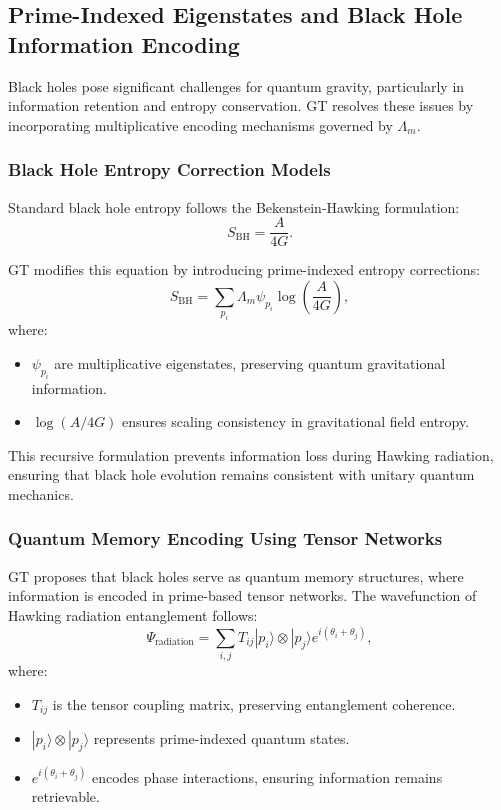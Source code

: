 \documentclass{article}
\theoremstyle{plain}
\begin{document}
\subsection{Prime-Indexed Eigenstates and Black Hole Information Encoding}
Black holes pose significant challenges for quantum gravity, particularly in information retention and entropy conservation. GT resolves these issues by incorporating multiplicative encoding mechanisms governed by $\Lambda_m$.

\subsubsection{Black Hole Entropy Correction Models}
Standard black hole entropy follows the Bekenstein-Hawking formulation:
\begin{equation}
    S_{\text{BH}} = \frac{A}{4 G}.
\end{equation}

GT modifies this equation by introducing prime-indexed entropy corrections:
\begin{equation}
    S_{\text{BH}} = \sum_{p_i} \Lambda_m \psi_{p_i} \log \left( \frac{A}{4G} \right),
\end{equation}
where:
\begin{itemize}
    \item $\psi_{p_i}$ are multiplicative eigenstates, preserving quantum gravitational information.
    \item $\log (A/4G)$ ensures scaling consistency in gravitational field entropy.
\end{itemize}

This recursive formulation prevents information loss during Hawking radiation, ensuring that black hole evolution remains consistent with unitary quantum mechanics.

\subsubsection{Quantum Memory Encoding Using Tensor Networks}
GT proposes that black holes serve as quantum memory structures, where information is encoded in prime-based tensor networks. The wavefunction of Hawking radiation entanglement follows:
\begin{equation}
    \Psi_{\text{radiation}} = \sum_{i,j} T_{ij} |p_i\rangle \otimes |p_j\rangle e^{i(\theta_i + \theta_j)},
\end{equation}
where:
\begin{itemize}
    \item $T_{ij}$ is the tensor coupling matrix, preserving entanglement coherence.
    \item $|p_i\rangle \otimes |p_j\rangle$ represents prime-indexed quantum states.
    \item $e^{i(\theta_i + \theta_j)}$ encodes phase interactions, ensuring information remains retrievable.
\end{itemize}
\end{document}
